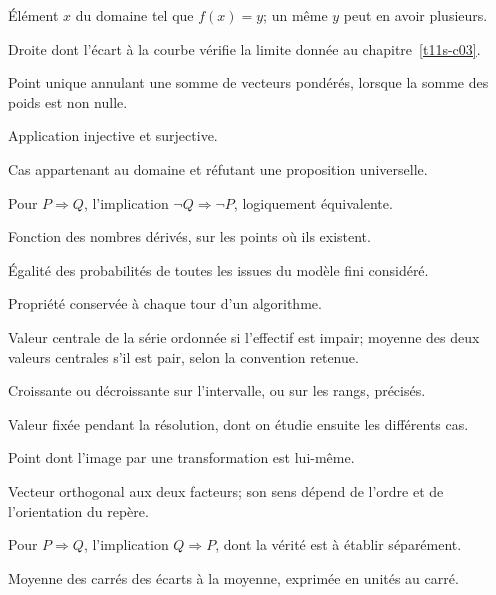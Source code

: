 \begin{description}[style=nextline,leftmargin=1em]
\item[Antécédent]Élément $x$ du domaine tel que $f(x)=y$; un même $y$ peut en avoir plusieurs.
\item[Asymptote]Droite dont l’écart à la courbe vérifie la limite donnée au chapitre~\ref{t11s-c03}.
\item[Barycentre]Point unique annulant une somme de vecteurs pondérés, lorsque la somme des poids est non nulle.
\item[Bijection]Application injective et surjective.
\item[Contre-exemple]Cas appartenant au domaine et réfutant une proposition universelle.
\item[Contraposée]Pour $P\Rightarrow Q$, l’implication $\neg Q\Rightarrow\neg P$, logiquement équivalente.
\item[Dérivée]Fonction des nombres dérivés, sur les points où ils existent.
\item[Équiprobabilité]Égalité des probabilités de toutes les issues du modèle fini considéré.
\item[Invariant]Propriété conservée à chaque tour d’un algorithme.
\item[Médiane]Valeur centrale de la série ordonnée si l’effectif est impair; moyenne des deux valeurs centrales s’il est pair, selon la convention retenue.
\item[Monotone]Croissante ou décroissante sur l’intervalle, ou sur les rangs, précisés.
\item[Paramètre]Valeur fixée pendant la résolution, dont on étudie ensuite les différents cas.
\item[Point fixe]Point dont l’image par une transformation est lui-même.
\item[Produit vectoriel]Vecteur orthogonal aux deux facteurs; son sens dépend de l’ordre et de l’orientation du repère.
\item[Réciproque]Pour $P\Rightarrow Q$, l’implication $Q\Rightarrow P$, dont la vérité est à établir séparément.
\item[Variance]Moyenne des carrés des écarts à la moyenne, exprimée en unités au carré.
\end{description}

